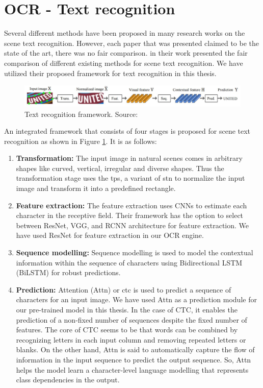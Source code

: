 \section{OCR - Text recognition}

Several different methods have been proposed in many research works on the scene text recognition. However, each paper that was presented claimed to be the state of the art, there was no fair comparison. \cite{baek2019wrong} in their work presented the fair comparison of different existing methods for scene text recognition. We have utilized their proposed framework for text recognition in this thesis. 

\begin{figure}[H]
\centering
\includegraphics[width=5.5in,scale=1.8]{images/textrec.eps}
\caption[Text recognition framework]{Text recognition framework. Source: \citep{baek2019wrong}}
\label{fig:frame}
\end{figure}

An integrated framework that consists of four stages is proposed for scene text recognition as shown in Figure \ref{fig:frame}. It is as follows:
\begin{enumerate}
\item \textbf{Transformation:}
	The input image in natural scenes comes in arbitrary shapes like curved, vertical, irregular and diverse shapes. Thus the transformation stage uses the \gls{tps}, a variant of \gls{stn} to normalize the input image and transform it into a predefined rectangle.
\item \textbf{Feature extraction:}
	The feature extraction uses CNNs to estimate each character in the receptive field. Their framework has the option to select between ResNet, VGG, and RCNN architecture for feature extraction. We have used ResNet for feature extraction in our OCR engine.
\item \textbf{Sequence modelling:}
	Sequence modelling is used to model the contextual information within the sequence of characters using Bidirectional LSTM (BiLSTM) for robust predictions. 
\item \textbf{Prediction:}
	Attention (Attn) or \gls{ctc} is used to predict a sequence of characters for an input image. We have used Attn as a prediction module for our pre-trained model in this thesis. In the case of CTC, it enables the prediction of a non-fixed number of sequences despite the fixed number of features. The core of CTC seems to be that words can be combined by recognizing letters in each input column and removing repeated letters or blanks. On the other hand, Attn is said to automatically capture the flow of information in the input sequence to predict the output sequence. So, Attn helps the model learn a character-level language modelling that represents class dependencies in the output.
\end{enumerate}

